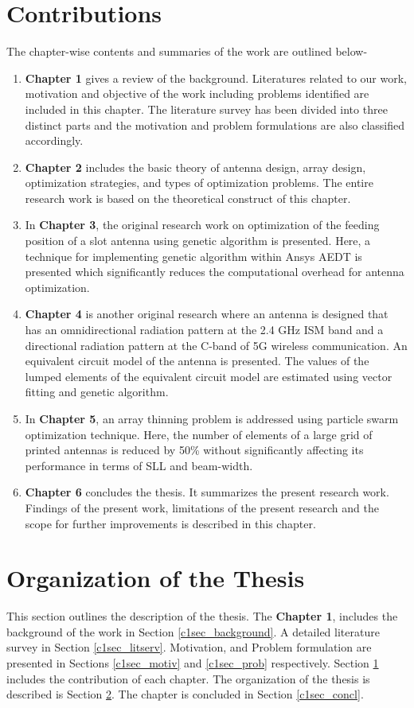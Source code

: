 \section{Contributions} \label{c1sec_contrib}
The chapter-wise contents and summaries of the work are outlined below-
\begin{enumerate}
\item \textbf{Chapter 1} gives a review of the background. Literatures related to our work, motivation and objective of the work including problems identified are included in this chapter. The literature survey has been divided into three distinct parts and the motivation and problem formulations are also classified accordingly.
\item \textbf{Chapter 2} includes the basic theory of antenna design, array design, optimization strategies, and types of optimization problems. The entire research work is based on the theoretical construct of this chapter.
\item In \textbf{Chapter 3}, the original research work on optimization of the feeding position of a slot antenna using genetic algorithm is presented. Here, a technique for implementing genetic algorithm within Ansys AEDT is presented which significantly reduces the computational overhead for antenna optimization.
\item \textbf{Chapter 4} is another original research where an antenna is designed that has an omnidirectional radiation pattern at the 2.4 GHz ISM band and a directional radiation pattern at the C-band of 5G wireless communication. An equivalent circuit model of the antenna is presented. The values of the lumped elements of the equivalent circuit model are estimated using vector fitting and genetic algorithm.
\item In \textbf{Chapter 5}, an array thinning problem is addressed using particle swarm optimization technique. Here, the number of elements of a large grid of printed antennas is reduced by 50\% without significantly affecting its performance in terms of SLL and beam-width.
\item \textbf{Chapter 6} concludes the thesis. It summarizes the present research work. Findings of the present work, limitations of the present research and the scope for further improvements is described in this chapter.
\end{enumerate}
\section{Organization of the Thesis} \label{c1sec_organiz}
This section outlines the description of the thesis. The \textbf{Chapter 1}, includes the background of the work in Section \ref{c1sec_background}. A detailed literature survey in Section \ref{c1sec_litserv}. Motivation, and Problem formulation are presented in Sections \ref{c1sec_motiv} and \ref{c1sec_prob} respectively. Section \ref{c1sec_contrib} includes the contribution of each chapter. The organization of the thesis is described is Section \ref{c1sec_organiz}. The chapter is concluded in Section \ref{c1sec_concl}.

